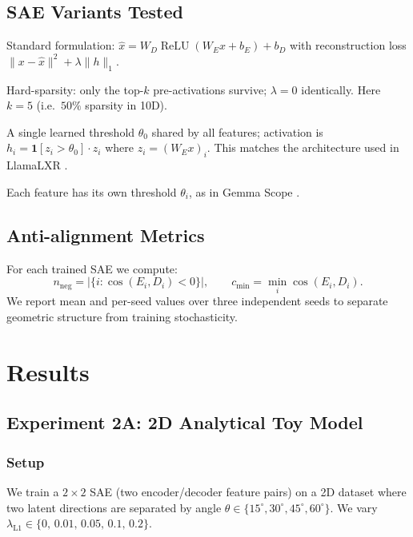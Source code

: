 \documentclass[11pt,a4paper]{article}
\newcommand{\cosED}{\cos(E_i, D_i)}
\newcommand{\nneg}{n_{\mathrm{neg}}}
\newcommand{\lambdaL}{\lambda_{\mathrm{L1}}}
\begin{document}
\subsection{SAE Variants Tested}

\begin{description}[noitemsep]
  \item[ReLU+L1] Standard formulation: $\hat{x} = W_D \operatorname{ReLU}(W_E x + b_E) + b_D$
    with reconstruction loss $\|x - \hat{x}\|^2 + \lambda\|h\|_1$.
  \item[TopK] Hard-sparsity: only the top-$k$ pre-activations survive; $\lambda{=}0$
    identically.  Here $k{=}5$ (i.e.\ $50\%$ sparsity in 10D).
  \item[JumpReLU~(scalar)] A single learned threshold $\theta_0$ shared by all features;
    activation is $h_i = \mathbf{1}[z_i > \theta_0]\cdot z_i$ where $z_i = (W_E x)_i$.
    This matches the architecture used in LlamaLXR \citep{rajamanoharan2024}.
  \item[JumpReLU~(per-feature)] Each feature has its own threshold $\theta_i$, as in
    Gemma Scope \citep{lieberum2024}.
\end{description}

\subsection{Anti-alignment Metrics}

For each trained SAE we compute:
\[
  \nneg = \bigl|\{i : \cosED < 0\}\bigr|, \qquad
  c_{\min} = \min_i \cosED.
\]
We report mean and per-seed values over three independent seeds to separate geometric
structure from training stochasticity.

\section{Results}
\label{sec:results}

\subsection{Experiment 2A: 2D Analytical Toy Model}
\label{sec:2a}

\subsubsection{Setup}
We train a $2{\times}2$ SAE (two encoder/decoder feature pairs) on a 2D dataset where
two latent directions are separated by angle $\theta \in \{15^\circ, 30^\circ, 45^\circ,
60^\circ\}$.  We vary $\lambdaL \in \{0,\, 0.01,\, 0.05,\, 0.1,\, 0.2\}$.
\end{document}
